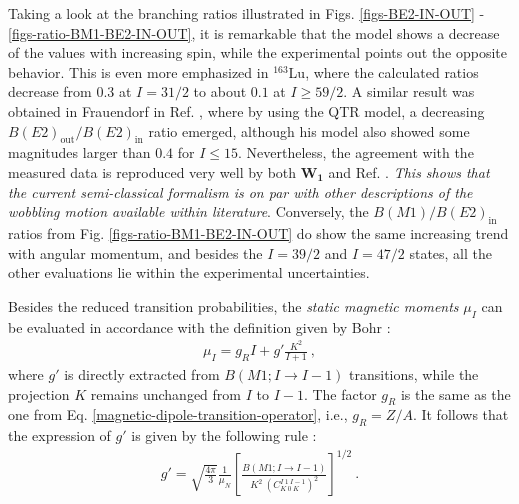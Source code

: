 Taking a look at the branching ratios illustrated in Figs. \ref{figs-BE2-IN-OUT} - \ref{figs-ratio-BM1-BE2-IN-OUT}, it is remarkable that the model shows a decrease of the values with increasing spin, while the experimental points out the opposite behavior. This is even more emphasized in $^{163}$Lu, where the calculated ratios decrease from $0.3$ at $I=31/2$ to about $0.1$ at $I\geq 59/2$. A similar result was obtained in Frauendorf in Ref. \cite{frauendorf2014transverse}, where by using the QTR model, a decreasing $B(E2)_\text{out}/B(E2)_\text{in}$ ratio emerged, although his model also showed some magnitudes larger than $0.4$ for $I\leq 15$. Nevertheless, the agreement with the measured data is reproduced very well by both $\mathbf{W_1}$ and Ref. \cite{frauendorf2014transverse}. \emph{This shows that the current semi-classical formalism is on par with other descriptions of the wobbling motion available within literature}. Conversely, the $B(M1)/B(E2)_\text{in}$ ratios from Fig. \ref{figs-ratio-BM1-BE2-IN-OUT} do show the same increasing trend with angular momentum, and besides the $I=39/2$ and $I=47/2$ states, all the other evaluations lie within the experimental uncertainties.

Besides the reduced transition probabilities, the \emph{static magnetic moments} $\mu_I$ can be evaluated in accordance with the definition given by Bohr \cite{bohr1998nuclear}:
\begin{align}
    \mu_I=g_RI+g'\frac{K^2}{I+1}\ , %
    \label{static-magnetic-moment}
\end{align}
where $g'$ is directly extracted from $B(M1;I\to I-1)$ transitions, while the projection $K$ remains unchanged from $I$ to $I-1$. The factor $g_R$ is the same as the one from Eq. \ref{magnetic-dipole-transition-operator}, i.e., $g_R=Z/A$. It follows that the expression of $g'$ is given by the following rule \cite{bohr1998nuclear}:
\begin{align}
    g'=\sqrt{\frac{4\pi}{3}}\frac{1}{\mu_N}\left[\frac{B(M1;I\to I-1)}{K^2\ \left(C_{K\ 0\ K}^{I\ 1\ I-1}\right)^2}\right]^{1/2}\ .
\end{align}

